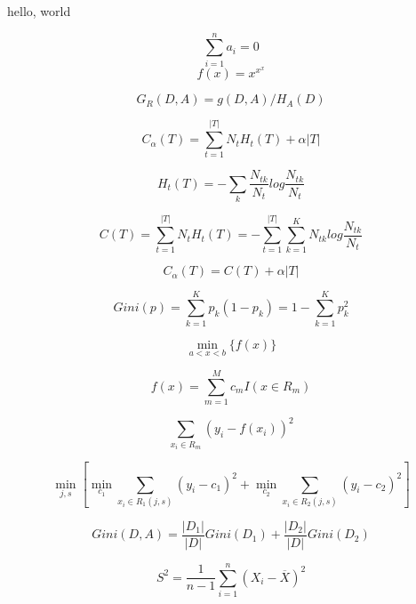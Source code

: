 \documentclass{article}
\begin{document}
hello, world

$$\sum_{i=1}^n a_i=0$$
$$f(x)=x^{x^x}$$

$$G_R(D,A)=g(D,A)/H_A(D)$$

$$C_\alpha(T)=\sum_{t=1}^{|T|} N_tH_t(T)+\alpha|T|$$

$$H_t(T)=-\sum_k \frac{N_{tk}}{N_t}log\frac{N_{tk}}{N_t}$$

$$C(T)=\sum_{t=1}^{|T|} N_t H_t (T)=-\sum_{t=1}^{|T|} \sum_{k=1}^{K} N_{tk} log \frac {N_{tk}}{N_t}$$

$$C_\alpha(T)=C(T)+\alpha|T|$$

$$Gini(p)=\sum_{k=1}^{K} p_k (1-p_k)=1-\sum_{k=1}^K p_{k}^{2}$$

$$\min \limits_{a<x<b}\{f(x)\}$$

$$f(x)=\sum_{m=1}^M c_m I(x\in R_m)$$

$$\sum_{x_i\in R_m} (y_i-f(x_i))^2$$

$$\min \limits_{j,s} [\min \limits_{c_1} \sum_{x_i\in R_1(j,s)} (y_i-c_1)^2+\min \limits_{c_2} \sum_{x_i \in R_2(j,s)} (y_i-c_2)^2]$$

$$Gini(D,A)=\frac{|D_1|}{|D|} Gini(D_1)+\frac{|D_2|}{|D|}Gini(D_2)$$

$$ S^{2} = \frac{1}{n-1}\sum_{i=1}^n (X_i - \overline{X})^{2}$$
\end{document}

